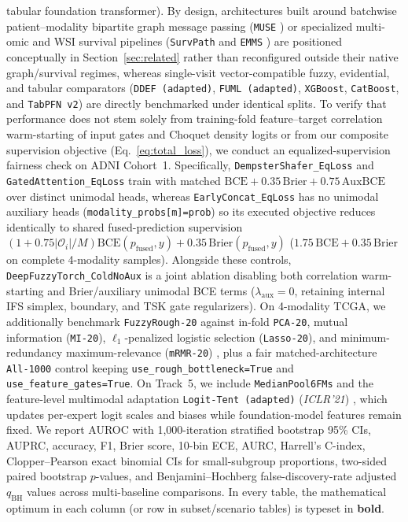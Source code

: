 \documentclass[10pt,twocolumn]{article}
\begin{document}
tabular foundation transformer). By design, architectures built around batchwise
patient--modality bipartite graph message passing (\texttt{MUSE} \cite{wu2024muse}) or
specialized multi-omic
and WSI survival pipelines (\texttt{SurvPath} \cite{jaume2024survpath} and \texttt{EMMS}
\cite{xing2026emms}) are positioned conceptually in Section~\ref{sec:related} rather than
reconfigured outside their native graph/survival regimes, whereas single-visit
vector-compatible fuzzy, evidential, and tabular comparators (\texttt{DDEF (adapted)},
\texttt{FUML (adapted)},
\texttt{XGBoost}, \texttt{CatBoost}, and \texttt{TabPFN~v2}) are directly benchmarked under
identical splits. To verify that performance does not stem solely from training-fold
feature--target correlation warm-starting of input gates and Choquet density logits or from our
composite supervision objective (Eq.~\eqref{eq:total_loss}), we conduct an
equalized-supervision fairness check on ADNI Cohort~1. Specifically,
\texttt{DempsterShafer\_EqLoss} and \texttt{GatedAttention\_EqLoss} train with matched
$\text{BCE}+0.35\,\text{Brier}+0.75\,\text{AuxBCE}$ over distinct unimodal heads, whereas
\texttt{EarlyConcat\_EqLoss} has no unimodal auxiliary heads (\texttt{modality\_probs[m]=prob})
so its executed objective reduces identically to shared fused-prediction supervision
$(1+0.75|\mathcal{O}_i|/M)\text{BCE}(p_{\text{fused}},y) +
0.35\,\text{Brier}(p_{\text{fused}},y)$ ($1.75\,\text{BCE}+0.35\,\text{Brier}$ on complete
4-modality samples). Alongside these controls, \texttt{DeepFuzzyTorch\_ColdNoAux} is a joint
ablation disabling both correlation warm-starting and Brier/auxiliary unimodal BCE terms
($\lambda_{\text{aux}}=0$, retaining internal IFS simplex, boundary, and TSK gate
regularizers). On 4-modality TCGA, we additionally benchmark \texttt{FuzzyRough-20} against
in-fold \texttt{PCA-20}, mutual information (\texttt{MI-20}), $\ell_1$-penalized logistic
selection (\texttt{Lasso-20}), and minimum-redundancy maximum-relevance (\texttt{mRMR-20})
\cite{peng2005feature}, plus a fair matched-architecture \texttt{All-1000} control keeping
\texttt{use\_rough\_bottleneck=True} and \texttt{use\_feature\_gates=True}. On Track~5, we
include \texttt{MedianPool6FMs} and the feature-level multimodal adaptation
\texttt{Logit-Tent (adapted)} (\textit{ICLR'21}) \cite{wang2021tent}, which updates
per-expert logit scales and biases while foundation-model features remain fixed. We report
AUROC with 1,000-iteration stratified bootstrap 95\%
CIs, AUPRC, accuracy, F1, Brier score, 10-bin ECE, AURC, Harrell's C-index, Clopper--Pearson
exact binomial CIs for small-subgroup proportions, two-sided paired bootstrap $p$-values, and
Benjamini--Hochberg false-discovery-rate adjusted $q_{\text{BH}}$ values across multi-baseline
comparisons. In every table, the mathematical optimum in each column (or row in subset/scenario
tables) is typeset in \textbf{bold}.
\end{document}
